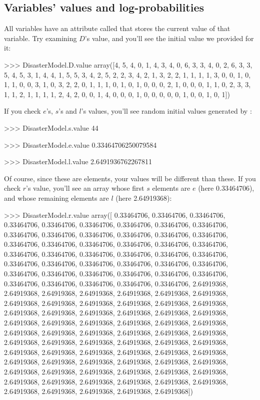 \documentclass[]{jss}
\begin{document}
\subsection{Variables' values and log-probabilities}
All  variables have an attribute called  that stores the current value of that variable. Try examining $D$'s value, and you'll see the initial value we provided for it:
\begin{CodeInput}
>>> DisasterModel.D.value
array([4, 5, 4, 0, 1, 4, 3, 4, 0, 6, 3, 3, 4, 0, 2, 6, 3, 3, 5, 4, 5, 3, 1,
      4, 4, 1, 5, 5, 3, 4, 2, 5, 2, 2, 3, 4, 2, 1, 3, 2, 2, 1, 1, 1, 1, 3,
      0, 0, 1, 0, 1, 1, 0, 0, 3, 1, 0, 3, 2, 2, 0, 1, 1, 1, 0, 1, 0, 1, 0,
      0, 0, 2, 1, 0, 0, 0, 1, 1, 0, 2, 3, 3, 1, 1, 2, 1, 1, 1, 1, 2, 4, 2,
      0, 0, 1, 4, 0, 0, 0, 1, 0, 0, 0, 0, 0, 1, 0, 0, 1, 0, 1])
\end{CodeInput}
If you check $e$'s, $s$'s and $l$'s values, you'll see random initial values generated by :
\begin{CodeInput}
>>> DisasterModel.s.value
44

>>> DisasterModel.e.value
0.33464706250079584

>>> DisasterModel.l.value
2.6491936762267811
\end{CodeInput}
Of course, since these are  elements, your values will be different than these. If you check $r$'s value, you'll see an array whose first $s$ elements are $e$ (here 0.33464706), and whose remaining elements are $l$ (here 2.64919368):
\begin{CodeInput}
>>> DisasterModel.r.value
array([ 0.33464706,  0.33464706,  0.33464706,  0.33464706,  0.33464706,
       0.33464706,  0.33464706,  0.33464706,  0.33464706,  0.33464706,
       0.33464706,  0.33464706,  0.33464706,  0.33464706,  0.33464706,
       0.33464706,  0.33464706,  0.33464706,  0.33464706,  0.33464706,
       0.33464706,  0.33464706,  0.33464706,  0.33464706,  0.33464706,
       0.33464706,  0.33464706,  0.33464706,  0.33464706,  0.33464706,
       0.33464706,  0.33464706,  0.33464706,  0.33464706,  0.33464706,
       0.33464706,  0.33464706,  0.33464706,  0.33464706,  0.33464706,
       0.33464706,  0.33464706,  0.33464706,  0.33464706,  2.64919368,
       2.64919368,  2.64919368,  2.64919368,  2.64919368,  2.64919368,
       2.64919368,  2.64919368,  2.64919368,  2.64919368,  2.64919368,
       2.64919368,  2.64919368,  2.64919368,  2.64919368,  2.64919368,
       2.64919368,  2.64919368,  2.64919368,  2.64919368,  2.64919368,
       2.64919368,  2.64919368,  2.64919368,  2.64919368,  2.64919368,
       2.64919368,  2.64919368,  2.64919368,  2.64919368,  2.64919368,
       2.64919368,  2.64919368,  2.64919368,  2.64919368,  2.64919368,
       2.64919368,  2.64919368,  2.64919368,  2.64919368,  2.64919368,
       2.64919368,  2.64919368,  2.64919368,  2.64919368,  2.64919368,
       2.64919368,  2.64919368,  2.64919368,  2.64919368,  2.64919368,
       2.64919368,  2.64919368,  2.64919368,  2.64919368,  2.64919368,
       2.64919368,  2.64919368,  2.64919368,  2.64919368,  2.64919368,
       2.64919368,  2.64919368,  2.64919368,  2.64919368,  2.64919368])
\end{CodeInput}
\end{document}
